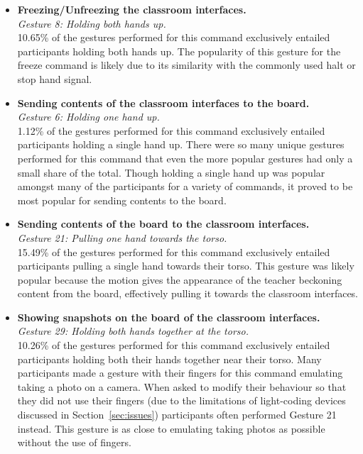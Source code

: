 \documentclass[link]{IWCOMP}
\begin{document}
\begin{itemize}

\item \textbf{Freezing/Unfreezing the classroom interfaces.}\\
\textit{Gesture 8: Holding both hands up.}\\  
10.65\% of the gestures performed for this command exclusively entailed participants holding both hands up.
The popularity of this gesture for the freeze command is likely due to its similarity with the commonly used halt or stop hand signal.\\

\item \textbf{Sending contents of the classroom interfaces to the board.}\\
\textit{Gesture 6: Holding one hand up.}\\
1.12\% of the gestures performed for this command exclusively entailed participants holding a single hand up.
There were so many unique gestures performed for this command that even the more popular gestures had only a small share of the total.
Though holding a single hand up was popular amongst many of the participants for a variety of commands, it proved to be most popular for sending contents to the board.\\

\item \textbf{Sending contents of the board to the classroom interfaces.}\\
\textit{Gesture 21: Pulling one hand towards the torso.}\\
15.49\% of the gestures performed for this command exclusively entailed participants pulling a single hand towards their torso.
This gesture was likely popular because the motion gives the appearance of the teacher beckoning content from the board, effectively pulling it towards the classroom interfaces.\\

\item \textbf{Showing snapshots on the board of the classroom interfaces.}\\
\textit{Gesture 29: Holding both hands together at the torso.}\\
10.26\% of the gestures performed for this command exclusively entailed participants holding both their hands together near their torso.
Many participants made a gesture with their fingers for this command emulating taking a photo on a camera.
When asked to modify their behaviour so that they did not use their fingers (due to the limitations of light-coding devices discussed in Section~\ref{sec:issues}) participants often performed Gesture 21 instead.
This gesture is as close to emulating taking photos as possible without the use of fingers.\\


\end{itemize}
\end{document}

